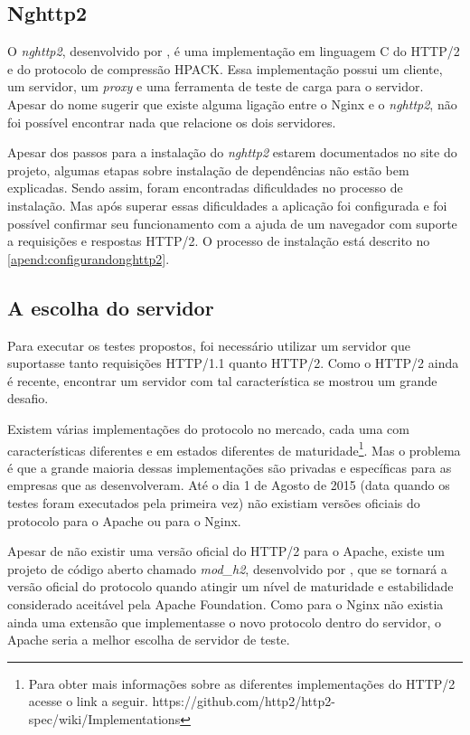 \subsection{Nghttp2}
\label{nghttp2}

O \textit{nghttp2}, desenvolvido por , é uma implementação em linguagem C do HTTP/2 e do protocolo de compressão HPACK. Essa implementação possui um cliente, um servidor, um \textit{proxy} e uma ferramenta de teste de carga para o servidor. Apesar do nome sugerir que existe alguma ligação entre o Nginx e o \textit{nghttp2}, não foi possível encontrar nada que relacione os dois servidores.

Apesar dos passos para a instalação do \textit{nghttp2} estarem documentados no site do projeto, algumas etapas sobre instalação de dependências não estão bem explicadas. Sendo assim, foram encontradas dificuldades no processo de instalação. Mas após superar essas dificuldades a aplicação foi configurada e foi possível confirmar seu funcionamento com a ajuda de um navegador com suporte a requisições e respostas HTTP/2. O processo de instalação está descrito no \autoref{apend:configurandonghttp2}.

\subsection{A escolha do servidor}
\label{aescolhadoservidor}

Para executar os testes propostos, foi necessário utilizar um servidor que suportasse tanto requisições HTTP/1.1 quanto HTTP/2. Como o HTTP/2 ainda é recente, encontrar um servidor com tal característica se mostrou um grande desafio.

Existem várias implementações do protocolo no mercado, cada uma com características diferentes e em estados diferentes de maturidade\footnote{Para obter mais informações sobre as diferentes implementações do HTTP/2 acesse o link a seguir. https://github.com/http2/http2-spec/wiki/Implementations}. Mas o problema é que a grande maioria dessas implementações são privadas e específicas para as empresas que as desenvolveram. Até o dia 1 de Agosto de 2015 (data quando os testes foram executados pela primeira vez) não existiam versões oficiais do protocolo para o Apache ou para o Nginx.

Apesar de não existir uma versão oficial do HTTP/2 para o Apache, existe um projeto de código aberto chamado \textit{mod\_h2}, desenvolvido por , que se tornará a versão oficial do protocolo quando atingir um nível de maturidade e estabilidade considerado aceitável pela Apache Foundation. Como para o Nginx não existia ainda uma extensão que implementasse o novo protocolo dentro do servidor, o Apache seria a melhor escolha de servidor de teste.


